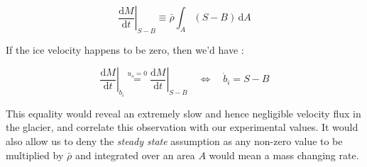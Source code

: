 \begin{equation}\left. \frac{\mathrm{d} M}{\mathrm{d}t} \right|_{S-B} \equiv \bar{\rho} \int_A (S-B) \, \mathrm{d}A\end{equation}

If the ice velocity happens to be zero, then we'd have :

\begin{equation}\left. \frac{\mathrm{d} M}{\mathrm{d}t} \right|_{\dot{b}_i} \stackrel{u_s = 0}{=} \left. \frac{\mathrm{d} M}{\mathrm{d}t} \right|_{S-B}
\quad
\Leftrightarrow
\quad
\boxed{\dot{b}_i = S-B}
\end{equation}

This equality would reveal an extremely slow and hence negligible velocity flux in the glacier, and correlate this observation with our experimental values. It would also allow us to deny the \textit{steady state} assumption as any non-zero value to be multiplied by $\bar{\rho}$ and integrated over an area $A$ would mean a mass changing rate.